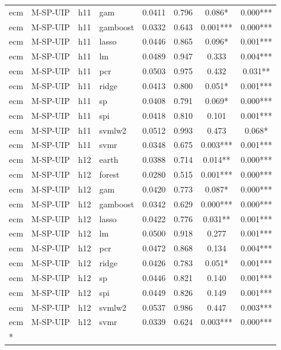 \begin{ThreePartTable}
\begin{longtable}[t]{llclcccc}
ecm & M-SP-UIP & h11 & gam & 0.0411 & 0.796 & 0.086* & 0.000***\\
ecm & M-SP-UIP & h11 & gamboost & 0.0332 & 0.643 & 0.001*** & 0.000***\\
ecm & M-SP-UIP & h11 & lasso & 0.0446 & 0.865 & 0.096* & 0.001***\\
ecm & M-SP-UIP & h11 & lm & 0.0489 & 0.947 & 0.333 & 0.004***\\
ecm & M-SP-UIP & h11 & pcr & 0.0503 & 0.975 & 0.432 & 0.031**\\
ecm & M-SP-UIP & h11 & ridge & 0.0413 & 0.800 & 0.051* & 0.001***\\
ecm & M-SP-UIP & h11 & sp & 0.0408 & 0.791 & 0.069* & 0.000***\\
ecm & M-SP-UIP & h11 & spi & 0.0418 & 0.810 & 0.101 & 0.001***\\
ecm & M-SP-UIP & h11 & svmlw2 & 0.0512 & 0.993 & 0.473 & 0.068*\\
ecm & M-SP-UIP & h11 & svmr & 0.0348 & 0.675 & 0.003*** & 0.001***\\
\addlinespace
ecm & M-SP-UIP & h12 & earth & 0.0388 & 0.714 & 0.014** & 0.000***\\
ecm & M-SP-UIP & h12 & forest & 0.0280 & 0.515 & 0.001*** & 0.000***\\
ecm & M-SP-UIP & h12 & gam & 0.0420 & 0.773 & 0.087* & 0.000***\\
ecm & M-SP-UIP & h12 & gamboost & 0.0342 & 0.629 & 0.000*** & 0.000***\\
ecm & M-SP-UIP & h12 & lasso & 0.0422 & 0.776 & 0.031** & 0.001***\\
ecm & M-SP-UIP & h12 & lm & 0.0500 & 0.918 & 0.277 & 0.001***\\
ecm & M-SP-UIP & h12 & pcr & 0.0472 & 0.868 & 0.134 & 0.004***\\
ecm & M-SP-UIP & h12 & ridge & 0.0426 & 0.783 & 0.051* & 0.001***\\
ecm & M-SP-UIP & h12 & sp & 0.0446 & 0.821 & 0.140 & 0.001***\\
ecm & M-SP-UIP & h12 & spi & 0.0449 & 0.826 & 0.149 & 0.001***\\
ecm & M-SP-UIP & h12 & svmlw2 & 0.0537 & 0.986 & 0.447 & 0.003***\\
ecm & M-SP-UIP & h12 & svmr & 0.0339 & 0.624 & 0.003*** & 0.000***\\*
\end{longtable}
\end{ThreePartTable}
\endgroup{}
